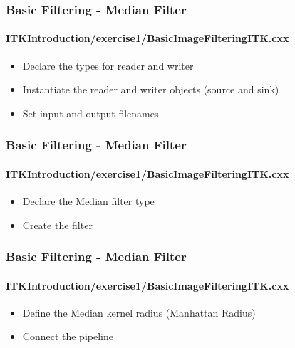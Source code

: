 {
\begin{frame}[fragile]
\frametitle{Basic Filtering - Median Filter}
\framesubtitle{ITKIntroduction/exercise1/BasicImageFilteringITK.cxx}
\begin{itemize}
\item Declare the types for reader and writer
\end{itemize}
\pause
\begin{itemize}
\item Instantiate the reader and writer objects (source and sink)
\end{itemize}
\pause
\begin{itemize}
\item Set input and output filenames
\end{itemize}
\end{frame}
}

{
\begin{frame}[fragile]
\frametitle{Basic Filtering - Median Filter}
\framesubtitle{ITKIntroduction/exercise1/BasicImageFilteringITK.cxx}
\begin{itemize}
\item Declare the Median filter type
\end{itemize}
\pause
\begin{itemize}
\item Create the filter
\end{itemize}
\end{frame}
}

{
\begin{frame}[fragile]
\frametitle{Basic Filtering - Median Filter}
\framesubtitle{ITKIntroduction/exercise1/BasicImageFilteringITK.cxx}
\begin{itemize}
\item Define the Median kernel radius (Manhattan Radius)
\end{itemize}
\pause
\begin{itemize}
\item Connect the pipeline
\end{itemize}
\end{frame}
}

